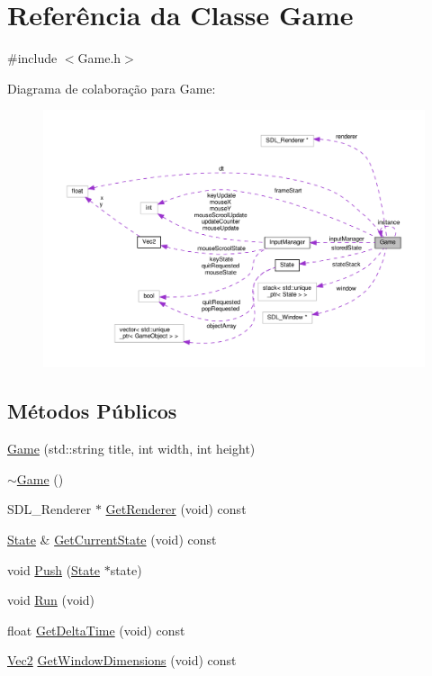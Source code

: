 \hypertarget{classGame}{\section{Referência da Classe Game}
\label{classGame}
}


{\ttfamily \#include $<$Game.\+h$>$}



Diagrama de colaboração para Game\+:
\nopagebreak
\begin{figure}[H]
\begin{center}
\leavevmode
\includegraphics[width=350pt]{classGame__coll__graph}
\end{center}
\end{figure}
\subsection*{Métodos Públicos}
\begin{DoxyCompactItemize}
\item 
\hyperlink{classGame_acf1ee7a59d78a51832e8878cfca81c5a}{Game} (std\+::string title, int width, int height)
\item 
\hyperlink{classGame_ae3d112ca6e0e55150d2fdbc704474530}{$\sim$\+Game} ()
\item 
S\+D\+L\+\_\+\+Renderer $\ast$ \hyperlink{classGame_a5749c6fc2bf3c98a4dc9c11e33f96c8b}{Get\+Renderer} (void) const 
\item 
\hyperlink{classState}{State} \& \hyperlink{classGame_a1f9d6f97e969424844881dd7ad2e353e}{Get\+Current\+State} (void) const 
\item 
void \hyperlink{classGame_ab5637c16d9580f8ec08b5830baff35bd}{Push} (\hyperlink{classState}{State} $\ast$state)
\item 
void \hyperlink{classGame_a7415a437ef79fd22feb4d26f714f9c0f}{Run} (void)
\item 
float \hyperlink{classGame_aa2feacb19b45ff0ec0935ea1a6f9c9ab}{Get\+Delta\+Time} (void) const 
\item 
\hyperlink{classVec2}{Vec2} \hyperlink{classGame_adbeb87bbabcc73f936e149c2d83d9d33}{Get\+Window\+Dimensions} (void) const 
\end{DoxyCompactItemize}
